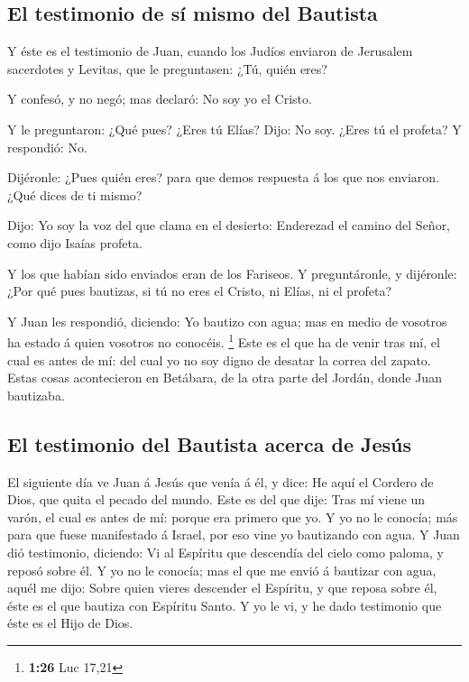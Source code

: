 \hypertarget{el-testimonio-de-suxed-mismo-del-bautista}{%
\subsection{El testimonio de sí mismo del
Bautista}\label{el-testimonio-de-suxed-mismo-del-bautista}}

 Y éste es el testimonio de Juan, cuando los Judíos
enviaron de Jerusalem sacerdotes y Levitas, que le preguntasen: ¿Tú,
quién eres?

 Y confesó, y no negó; mas declaró: No soy yo el Cristo.

 Y le preguntaron: ¿Qué pues? ¿Eres tú Elías? Dijo: No soy.
¿Eres tú el profeta? Y respondió: No.~

 Dijéronle: ¿Pues quién eres? para que demos respuesta á
los que nos enviaron. ¿Qué dices de ti mismo?

 Dijo: Yo soy la voz del que clama en el desierto:
Enderezad el camino del Señor, como dijo Isaías profeta.

 Y los que habían sido enviados eran de los Fariseos.
 Y preguntáronle, y dijéronle: ¿Por qué pues bautizas, si
tú no eres el Cristo, ni Elías, ni el profeta?

 Y Juan les respondió, diciendo: Yo bautizo con agua; mas
en medio de vosotros ha estado á quien vosotros no conocéis. \footnote{\textbf{1:26}
  Luc 17,21}  Este es el que ha de venir tras mí, el cual
es antes de mí: del cual yo no soy digno de desatar la correa del
zapato.  Estas cosas acontecieron en Betábara, de la otra
parte del Jordán, donde Juan bautizaba.

\hypertarget{el-testimonio-del-bautista-acerca-de-jesuxfas}{%
\subsection{El testimonio del Bautista acerca de
Jesús}\label{el-testimonio-del-bautista-acerca-de-jesuxfas}}

 El siguiente día ve Juan á Jesús que venía á él, y dice:
He aquí el Cordero de Dios, que quita el pecado del mundo. 
Este es del que dije: Tras mí viene un varón, el cual es antes de mí:
porque era primero que yo.  Y yo no le conocía; más para
que fuese manifestado á Israel, por eso vine yo bautizando con agua.
 Y Juan dió testimonio, diciendo: Vi al Espíritu que
descendía del cielo como paloma, y reposó sobre él.  Y yo
no le conocía; mas el que me envió á bautizar con agua, aquél me dijo:
Sobre quien vieres descender el Espíritu, y que reposa sobre él, éste es
el que bautiza con Espíritu Santo.  Y yo le vi, y he dado
testimonio que éste es el Hijo de Dios.

